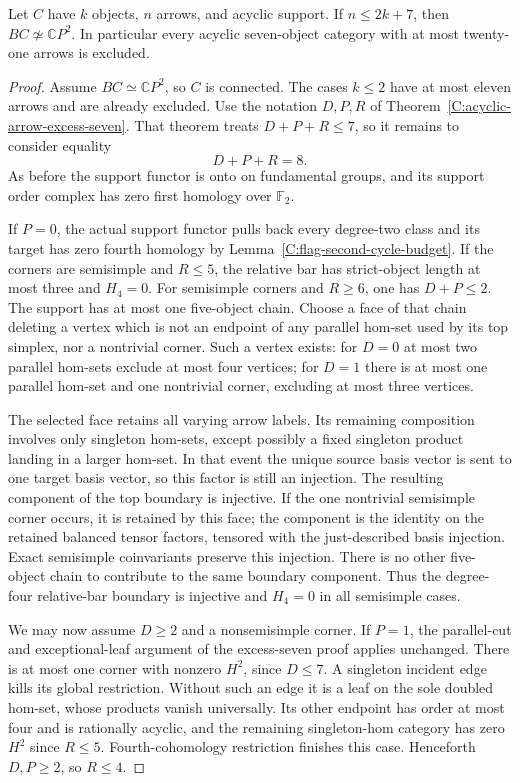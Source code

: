 \begin{theorem}\label{C:acyclic-arrow-excess-eight}
Let $C$ have $k$ objects, $n$ arrows, and acyclic support.
If $n\leq2k+7$, then $BC\not\simeq\mathbb CP^2$.
In particular every acyclic seven-object category with
at most twenty-one arrows is excluded.
\end{theorem}
\begin{proof}
Assume $BC\simeq\mathbb CP^2$, so $C$ is connected.
The cases $k\leq2$ have at most eleven arrows and are
already excluded.  Use the notation $D,P,R$ of
Theorem~\ref{C:acyclic-arrow-excess-seven}.
That theorem treats $D+P+R\leq7$, so it remains to
consider equality
\[
 D+P+R=8.
\]
As before the support functor is onto on fundamental
groups, and its support order complex has zero first
homology over $\mathbb F_2$.

If $P=0$, the actual support functor pulls back every
degree-two class and its target has zero fourth homology
by Lemma~\ref{C:flag-second-cycle-budget}.
If the corners are semisimple and $R\leq5$, the relative
bar has strict-object length at most three and $H_4=0$.
For semisimple corners and $R\geq6$, one has
$D+P\leq2$.  The support has at most one five-object
chain.  Choose a face of that chain deleting a vertex
which is not an endpoint of any parallel hom-set used
by its top simplex, nor a nontrivial corner.
Such a vertex exists: for $D=0$ at most two parallel
hom-sets exclude at most four vertices; for $D=1$ there
is at most one parallel hom-set and one nontrivial
corner, excluding at most three vertices.

The selected face retains all varying arrow labels.
Its remaining composition involves only singleton
hom-sets, except possibly a fixed singleton product
landing in a larger hom-set.  In that event the unique
source basis vector is sent to one target basis vector,
so this factor is still an injection.  The resulting
component of the top boundary is injective.  If the one nontrivial
semisimple corner occurs, it is retained by this face;
the component is the identity on the retained balanced
tensor factors, tensored with the just-described basis
injection.  Exact semisimple coinvariants preserve this
injection.  There is no other five-object
chain to contribute to the same boundary component.
Thus the degree-four relative-bar boundary is injective
and $H_4=0$ in all semisimple cases.

We may now assume $D\geq2$ and a nonsemisimple corner.
If $P=1$, the parallel-cut and exceptional-leaf argument
of the excess-seven proof applies unchanged.  There is
at most one corner with nonzero $H^2$, since $D\leq7$.
A singleton incident edge kills its global restriction.
Without such an edge it is a leaf on the sole doubled
hom-set, whose products vanish universally.  Its other
endpoint has order at most four and is rationally acyclic,
and the remaining singleton-hom category has zero $H^2$
since $R\leq5$.  Fourth-cohomology restriction finishes
this case.  Henceforth $D,P\geq2$, so $R\leq4$.


\end{proof}
